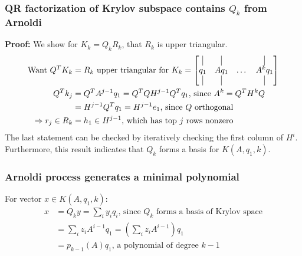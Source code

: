 \documentclass{article}
\begin{document}
\subsubsection{QR factorization of Krylov subspace contains $Q_k$ from Arnoldi}
\textbf{Proof:} We show for $K_k = Q_kR_k$, that $R_k$ is upper triangular.
\begin{align*}
    \textrm{Want } Q^TK_k &= R_k \textrm{ upper triangular for } K_k = \begin{bmatrix}
        \vline & \vline & & \vline \\ q_1 & Aq_1& \dots & A^kq_1 \\ \vline & \vline & & \vline \end{bmatrix}\\
        Q^Tk_j &= Q^TA^{j-1}q_1 = Q^T Q H^{j-1} Q^T q_1 \textrm{, since } A^k = Q^T H^k Q\\
        &= H^{j-1} Q^T q_1 = H^{j-1} e_1 \textrm{, since $Q$ orthogonal}\\
        \Rightarrow r_j \in R_k &= h_1 \in H^{j-1} \textrm{, which has top $j$ rows nonzero}
\end{align*}
The last statement can be checked by iteratively checking the first column of $H^i$. Furthermore, this result indicates that $Q_k$ forms a basis for $K(A, q_1, k)$.

\subsubsection{Arnoldi process generates a minimal polynomial}
For vector $x \in K(A, q_1, k)$:
\begin{align*}
    x &= Q_ky = \sum_i y_i q_i \textrm{, since $Q_k$ forms a basis of Krylov space}\\
    &= \sum_i z_iA^{i-1}q_1 = (\sum_i z_iA^{i-1})q_1\\
    &= p_{k-1}(A)q_1 \textrm{, a polynomial of degree $k-1$}
\end{align*}


\end{document}
